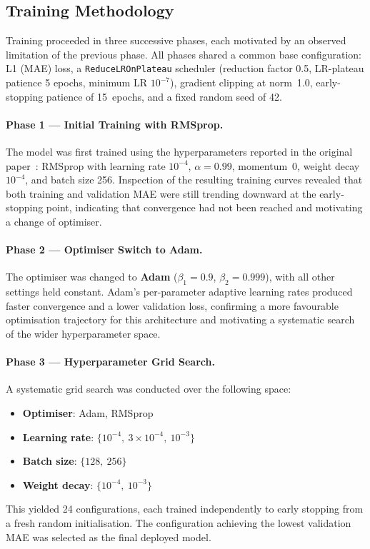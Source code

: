 \subsection{Training Methodology}
\label{subsubsec:bp_training}

\noindent Training proceeded in three successive phases, each motivated by an observed limitation of
the previous phase.
All phases shared a common base configuration: L1 (MAE) loss, a
\texttt{ReduceLROnPlateau} scheduler (reduction factor 0.5, LR-plateau patience 5 epochs,
minimum LR $10^{-7}$), gradient clipping at norm~1.0, early-stopping patience of 15~epochs,
and a fixed random seed of 42.

\paragraph{Phase 1 — Initial Training with RMSprop.}
The model was first trained using the hyperparameters reported in the original
paper~\cite{Slapnicar2019}: RMSprop with learning rate $10^{-4}$, $\alpha{=}0.99$,
momentum~0, weight decay $10^{-4}$, and batch size 256.
Inspection of the resulting training curves revealed that both training and validation MAE
were still trending downward at the early-stopping point, indicating that convergence had
not been reached and motivating a change of optimiser.

\paragraph{Phase 2 — Optimiser Switch to Adam.}
The optimiser was changed to \textbf{Adam} ($\beta_1{=}0.9$, $\beta_2{=}0.999$), with all
other settings held constant.
Adam's per-parameter adaptive learning rates produced faster convergence and a lower
validation loss, confirming a more favourable optimisation trajectory for this architecture
and motivating a systematic search of the wider hyperparameter space.

\paragraph{Phase 3 — Hyperparameter Grid Search.}
A systematic grid search was conducted over the following space:
\begin{itemize}
  \item \textbf{Optimiser}: Adam, RMSprop
  \item \textbf{Learning rate}: $\{10^{-4},\ 3{\times}10^{-4},\ 10^{-3}\}$
  \item \textbf{Batch size}: $\{128,\ 256\}$
  \item \textbf{Weight decay}: $\{10^{-4},\ 10^{-3}\}$
\end{itemize}
This yielded 24 configurations, each trained independently to early stopping from a fresh
random initialisation.
The configuration achieving the lowest validation MAE was selected as the final deployed model.


